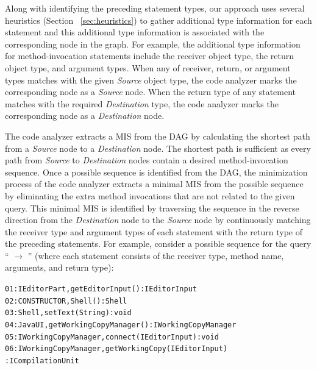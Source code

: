 \documentclass{fp035-thummalapenta}
\begin{document}
Along with identifying the preceding statement types, our
approach uses several heuristics (Section ~\ref{sec:heuristics}) to
gather additional type information for each statement and this
additional type information is associated with the corresponding
node in the graph. For example, the additional type information for
method-invocation statements include the receiver object type, the
return object type, and argument types. When any of receiver, return,
or argument types matches with the given \emph{Source} object type,
the code analyzer marks the corresponding node as a \emph{Source}
node. When the return type of any statement matches with the
required \emph{Destination} type, the code analyzer marks the
corresponding node as a \emph{Destination} node.

The code analyzer extracts a MIS from the DAG by calculating the
shortest path from a \emph{Source} node to a \emph{Destination}
node. The shortest path is sufficient as every path from
\emph{Source} to \emph{Destination} nodes contain a desired
method-invocation sequence. Once a possible sequence is identified
from the DAG, the minimization process of the code analyzer extracts
a minimal MIS from the possible sequence by eliminating the extra
method invocations that are not related to the given query. This
minimal MIS is identified by traversing the sequence in the reverse
direction from the \emph{Destination} node to the \emph{Source} node
by continuously matching the receiver type and argument types of
each statement with the return type of the preceding statements. For
example, consider a possible sequence for the query
`` $\rightarrow$ ''
(where each statement consists of the receiver type, method
name, arguments, and return type):

\begin{CodeOut}
\begin{alltt}
01:IEditorPart,getEditorInput() : IEditorInput
02:CONSTRUCTOR,Shell() : Shell
03:Shell,setText(String) : void
04:JavaUI,getWorkingCopyManager() : IWorkingCopyManager
05:IWorkingCopyManager,connect(IEditorInput) : void
06:IWorkingCopyManager,getWorkingCopy(IEditorInput)
\hspace*{0.5in}: ICompilationUnit
\end{alltt}
\end{CodeOut}
\end{document}
